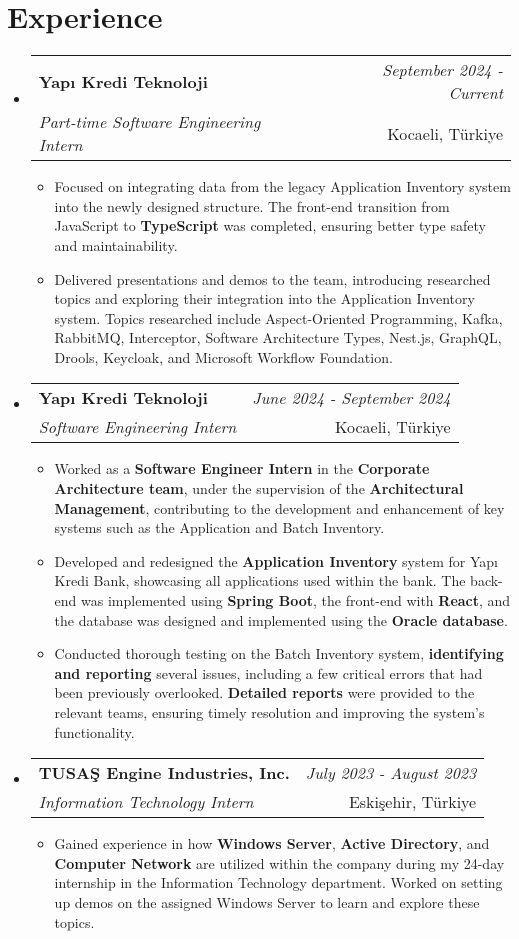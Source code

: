 \documentclass[a4paper,11pt]{article}
\makeatletter
\newcommand{\resumeProject}[4]{
\vspace{0.5mm}\item
    \begin{tabular*}{0.98\textwidth}[t]{l@{\extracolsep{\fill}}r}
    \textbf{#1} & \textit{\footnotesize{#3}} \\
    \footnotesize{\textit{#2}} & \footnotesize{#4}\end{tabular*}\vspace{-2.4mm}
}
\newcommand{\resumeSubHeadingListStart}{\begin{itemize}[leftmargin=*,labelsep=0mm]}
\newcommand{\resumeItemListStart}{\begin{justify}\begin{itemize}[leftmargin=3ex, rightmargin=2ex, noitemsep,labelsep=1.2mm,itemsep=0mm]\small}
\newcommand{\resumeSubHeadingListEnd}{\end{itemize}\vspace{2mm}}
\newcommand{\resumeItemListEnd}{\end{itemize}\end{justify}\vspace{-2mm}}
\makeatother
\begin{document}

\section{\textbf{Experience}}
    \resumeSubHeadingListStart
        \resumeProject
            {Yapı Kredi Teknoloji} {Part-time Software Engineering Intern}
            {September 2024 - Current} {Kocaeli, Türkiye}
                \resumeItemListStart
                    \item {Focused on integrating data from the legacy Application Inventory system into the newly designed structure. The front-end transition from JavaScript to {\textbf{TypeScript}} was completed, ensuring better type safety and maintainability.}
                    \item {Delivered presentations and demos to the team, introducing researched topics and exploring their integration into the Application Inventory system. Topics researched include Aspect-Oriented Programming, Kafka, RabbitMQ, Interceptor, Software Architecture Types, Nest.js, GraphQL, Drools, Keycloak, and Microsoft Workflow Foundation.}
                \resumeItemListEnd
        \resumeProject
            {Yapı Kredi Teknoloji} {Software Engineering Intern}
            {June 2024 - September 2024} {Kocaeli, Türkiye}
                \resumeItemListStart
                    \item {Worked as a {\textbf{Software Engineer Intern}} in the {\textbf{Corporate Architecture team}}, under the supervision of the {\textbf{Architectural Management}}, contributing to the development and enhancement of key systems such as the Application and Batch Inventory.}
                    \item {Developed and redesigned the {\textbf{Application Inventory}} system for Yapı Kredi Bank, showcasing all applications used within the bank. The back-end was implemented using {\textbf{Spring Boot}}, the front-end with {\textbf{React}}, and the database was designed and implemented using the {\textbf{Oracle database}}.}
                    \item {Conducted thorough testing on the Batch Inventory system, {\textbf{identifying and reporting}} several issues, including a few critical errors that had been previously overlooked. {\textbf{Detailed reports}} were provided to the relevant teams, ensuring timely resolution and improving the system's functionality.}
                \resumeItemListEnd
        \resumeProject
            {TUSAŞ Engine Industries, Inc.} {Information Technology Intern}
            {July 2023 - August 2023} {Eskişehir, Türkiye}
                \resumeItemListStart
                    \item {Gained experience in how {\textbf{Windows Server}}, {\textbf{Active Directory}}, and {\textbf{Computer Network}} are utilized within the company during my 24-day internship in the Information Technology department. Worked on setting up demos on the assigned Windows Server to learn and explore these topics.}
                \resumeItemListEnd
    \resumeSubHeadingListEnd
\vspace{-6.5mm}
\end{document}
